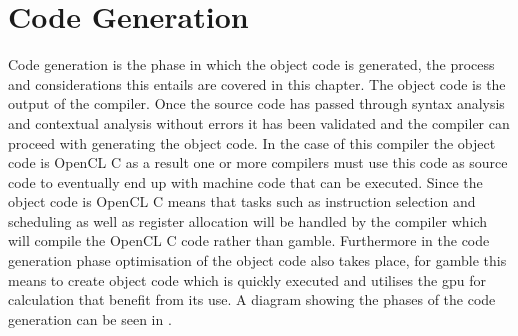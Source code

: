 \chapter{Code Generation}
Code generation is the phase in which the object code is generated, the process and considerations this entails are covered in this chapter.
The object code is the output of the compiler.
Once the source code has passed through syntax analysis and contextual analysis without errors it has been validated and the compiler can proceed with generating the object code.
In the case of this compiler the object code is OpenCL C as a result one or more compilers must use this code as source code to eventually end up with machine code that can be executed.
Since the object code is OpenCL C means that tasks such as instruction selection and scheduling as well as register allocation will be handled by the compiler which will compile the OpenCL C code rather than \gls{gamble}.
Furthermore in the code generation phase optimisation of the object code also takes place, for \gls{gamble} this means to create object code which is quickly executed and utilises the \acrshort{gpu} for calculation that benefit from its use.
A diagram showing the phases of the code generation can be seen in .


